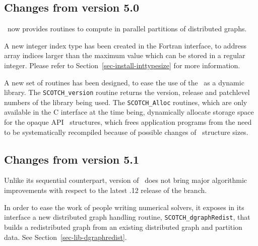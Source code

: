 \subsection{Changes from version 5.0}

\ptscotch\ now provides routines to compute in
parallel partitions of distributed graphs.

A new integer index type has been created in the Fortran interface, to
address array indices larger than the maximum value which can be
stored in a regular integer. Please refer to
Section~\ref{sec-install-inttypesize} for more information.

A new set of routines has been designed, to ease the use of the
\libscotch\ as a dynamic library. The {\tt SCOTCH\_\lbt version}
routine returns the version, release and patchlevel numbers of the
library being used. The {\tt SCOTCH\_\lbt *Alloc} routines,
which are only available in the C interface at the time being,
dynamically allocate storage space for the opaque API
\scotch\ structures, which frees application programs from the need
to be systematically recompiled because of possible changes of
\scotch\ structure sizes.

\subsection{Changes from version 5.1}

Unlike its sequential counterpart, version {} of
\ptscotch\ does not bring major algorithmic improvements with respect
to the latest {.12} release of the {} branch.

In order to ease the work of people writing numerical solvers, it
exposes in its interface a new distributed graph handling routine,
{\tt SCOTCH\_\lbt dgraph\lbt Redist}, that builds a redistributed
graph from an existing distributed graph and partition data. See
Section~\ref{sec-lib-dgraphredist}.
